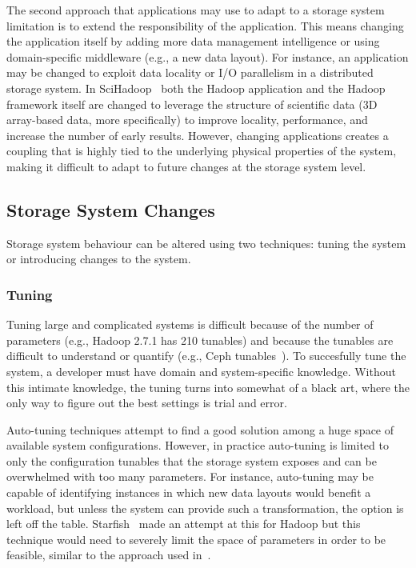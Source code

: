 \documentclass[10pt,twocolumn]{article}
\begin{document}
The second approach that applications may use to adapt to a storage system
limitation is to extend the responsibility of the application. This means
changing the application itself by adding more data management intelligence or
using domain-specific middleware (e.g., a new data layout). For instance, an
application may be changed to exploit data locality or I/O parallelism in a
distributed storage system.
In SciHadoop~\cite{buck:hpc2011-scihadoop,buck:sc2013-scidr} both the Hadoop
application and the Hadoop framework itself are changed to leverage the structure of
scientific data (3D array-based data, more specifically) to
improve locality, performance, and increase the number of early results. %
However, changing applications creates a coupling that is highly tied to the
underlying physical properties of the system, making it difficult to
adapt to future changes at the storage system level.
\fi

\subsection{Storage System Changes}\label{storage-changes}

Storage system behaviour can be altered using two
techniques: tuning the system or introducing changes to the system.

\subsubsection{Tuning}\label{tuning}

Tuning large and complicated systems is difficult because of the number
of parameters (e.g., Hadoop 2.7.1 has 210 tunables) and because the
tunables are difficult to understand or quantify (e.g., Ceph tunables~\cite{sevilla:sc15-mantle}). To succesfully tune the system, a
developer must have domain and system-specific knowledge. Without this
intimate knowledge, the tuning turns into somewhat of a black art, where
the only way to figure out the best settings is trial and error.

Auto-tuning techniques attempt to find a good solution among a huge space of
available system configurations. However, in practice auto-tuning is limited
to only the configuration tunables that the storage system exposes and can be
overwhelmed with too many parameters.  For instance, auto-tuning may be
capable of identifying instances in which new data layouts would benefit a
workload, but unless the system can provide such a transformation, the option
is left off the table.  Starfish~\cite{herodotou:cidr2011-starfish} made
an attempt at this for Hadoop but this technique would need to severely limit
the space of parameters in order to be feasible, similar to the approach used in~\cite{behzad:sc2013-autotuning}.
\end{document}
